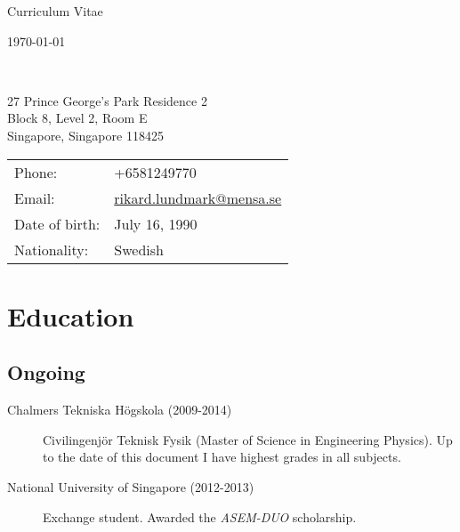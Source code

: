 



\panicmargindecrement{-0.9cm}{0.5cm}
\addtolength{\textheight}{1.5cm}







\vspace*{-0.7in}
\begin{minipage}{0.45\linewidth}
{\Huge Curriculum Vitae }
\end{minipage}
\begin{minipage}{0.45\linewidth}
{\hfill \small \ddmmyyyydate \today}
\end{minipage}
\vspace*{0.12in}
{\tiny }\\
{\huge \AuthorName}


\vspace{0.1in}
\begin{minipage}{0.45\linewidth}
  27 Prince George's Park Residence 2\\
  Block 8, Level 2, Room E \\
  Singapore, Singapore 118425 \\
    
\end{minipage}
\begin{minipage}{0.45\linewidth}
  \begin{tabular}{ll}
    Phone: & +6581249770\\
    Email: & \href{mailto:rikard.lundmark@mensa.se}{rikard.lundmark@mensa.se}\\
    Date of birth: & July 16, 1990 \\
    Nationality: & Swedish
  \end{tabular}
\end{minipage}

\section*{Education}

\subsection*{Ongoing}
\begin{description}
\item[Chalmers Tekniska Högskola (2009-2014)] Civilingenjör Teknisk Fysik (Master of Science in Engineering Physics). Up to the date of this document I have highest grades in all subjects.
\item[National University of Singapore (2012-2013)] Exchange student. Awarded the \emph{ASEM-DUO} scholarship.
\end{description}

